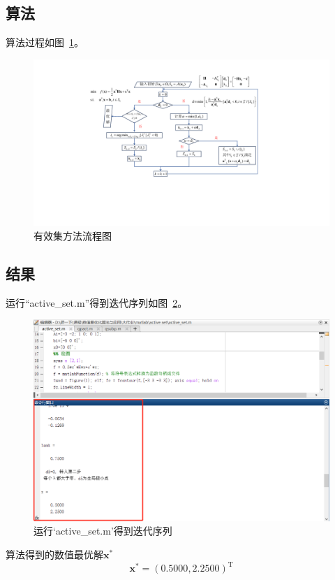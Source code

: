 \subsection{算法}
算法过程如图~\ref{fig:active_set-flow}。
\begin{figure}[H]
    \centering
    \includegraphics[width = .8\textwidth]{image/active_set-flow.pdf}
    \caption{有效集方法流程图}
    \label{fig:active_set-flow}
\end{figure}
\subsection{结果}
运行``active\_set.m''得到迭代序列如图~\ref{fig:active_set-matlab}。
\begin{figure}[H]
    \centering
    \includegraphics[width = .8\textwidth]{image/active_set-matlab.png}
    \caption{运行`active\_set.m'得到迭代序列}
    \label{fig:active_set-matlab}
\end{figure}

算法得到的数值最优解$\boldsymbol{x}^*$
\[
    \boldsymbol{x}^* = \left( 0.5000,2.2500 \right)^{\mathrm{T}}
\]


